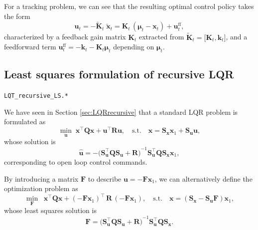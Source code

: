 \documentclass[10pt,a4paper]{article} %
\newcommand{\trsp}{{\scriptscriptstyle\top}}
\newcommand{\filename}[1]{\colorbox{rr2}{\color{white}\texttt{#1}}}
\begin{document}
For a tracking problem, we can see that the resulting optimal control policy takes the form
\begin{equation}
	\bm{\hat{u}}_t = -\bm{\tilde{K}}_t \; \bm{\tilde{x}}_t 
	= \bm{K}_t \, (\bm{\mu}_t - \bm{x}_t) + \bm{u}^\text{ff}_t,
	\label{eq:uLQTrecursive}
\end{equation}
characterized by a feedback gain matrix $\bm{K}_t$ extracted from $\bm{\tilde{K}}_t = \big[\bm{K}_t, \bm{k}_t\big]$, and a feedforward term $\bm{u}^\text{ff}_t = -\bm{k}_t - \bm{K}_t \bm{\mu}_t$ depending on $\bm{\mu}_t$.


\subsection{Least squares formulation of recursive LQR}\label{sec:LQRLS}
\begin{flushright}
\filename{LQT\_recursive\_LS.*}
\end{flushright}

We have seen in Section \ref{sec:LQRrecursive} that a standard LQR problem is formulated as
\begin{equation*}
	\min_{\bm{u}} \; \bm{x}^{\!\trsp} \bm{Q} \bm{x}
	+
	\bm{u}^{\!\trsp} \!\bm{R} \bm{u},
	\quad\text{s.t.}\quad
	\bm{x}=\bm{S}_{\bm{x}}\bm{x}_1+\bm{S}_{\bm{u}}\bm{u},
\end{equation*}
whose solution is
\begin{equation*}
	\bm{\hat{u}} = -\big({\bm{S}_{\bm{u}}^\trsp \bm{Q} \bm{S}_{\bm{u}} + \bm{R}\big)}^{-1}
	\bm{S}_{\bm{u}}^\trsp \bm{Q} \bm{S}_{\bm{x}} \bm{x}_1,
\end{equation*}
corresponding to open loop control commands.

By introducing a matrix $\bm{F}$ to describe $\bm{u}=-\bm{F}\bm{x}_1$, we can alternatively define the optimization problem as
\begin{equation*}
	\min_{\bm{F}} \;\; \bm{x}^{\!\trsp} \bm{Q} \bm{x}
	+
	(-\bm{F}\bm{x}_1)^{\!\trsp} \,\bm{R}\, (-\bm{F}\bm{x}_1), 
	\quad\text{s.t.}\quad
	\bm{x}=(\bm{S}_{\bm{x}}-\bm{S}_{\bm{u}}\bm{F})\bm{x}_1,
\end{equation*}
whose least squares solution is
\begin{equation}
	\bm{F} = {\big(\bm{S}_{\bm{u}}^\trsp \bm{Q} \bm{S}_{\bm{u}} + \bm{R}\big)}^{-1}
	\bm{S}_{\bm{u}}^\trsp \bm{Q} \bm{S}_{\bm{x}}.
	\label{eq:LQR_LS_F}
\end{equation}
\end{document}
